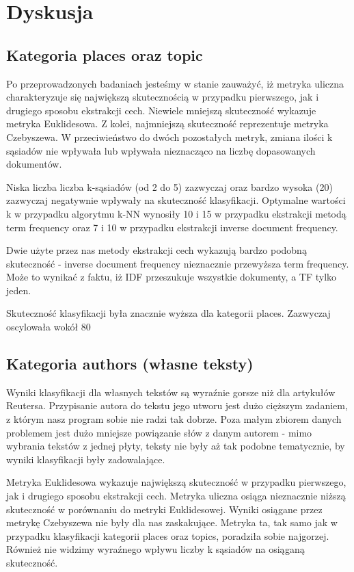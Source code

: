 \documentclass{classrep}
\begin{document}
\section{Dyskusja}

\subsection{Kategoria places oraz topic}
Po przeprowadzonych badaniach jesteśmy w stanie zauważyć, iż metryka uliczna charakteryzuje się największą skutecznością w przypadku pierwszego, jak i drugiego sposobu ekstrakcji cech. Niewiele mniejszą skuteczność wykazuje metryka Euklidesowa. Z kolei, najmniejszą skuteczność reprezentuje metryka Czebyszewa. W przeciwieństwo do dwóch pozostałych metryk, zmiana ilości k sąsiadów nie wpływała lub wpływała nieznacząco na liczbę dopasowanych dokumentów. \newline

Niska liczba liczba k-sąsiadów (od 2 do 5) zazwyczaj oraz bardzo wysoka (20) zazwyczaj negatywnie wpływały na skuteczność klasyfikacji. Optymalne wartości k w przypadku algorytmu k-NN wynosiły 10 i 15 w przypadku ekstrakcji metodą term frequency oraz 7 i 10 w przypadku ekstrakcji inverse document frequency. \newline

Dwie użyte przez nas metody ekstrakcji cech wykazują bardzo podobną skuteczność - inverse document frequency nieznacznie przewyższa term frequency. Może to wynikać z faktu, iż IDF przeszukuje wszystkie dokumenty, a TF tylko jeden.  \newline

Skuteczność klasyfikacji była znacznie wyższa dla kategorii places. Zazwyczaj oscylowała wokół 80%

\subsection{Kategoria authors (własne teksty)}
Wyniki klasyfikacji dla własnych tekstów są wyraźnie gorsze niż dla artykułów Reutersa. Przypisanie autora do tekstu jego utworu jest dużo cięższym zadaniem, z którym nasz program sobie nie radzi tak dobrze. Poza małym zbiorem danych problemem jest dużo mniejsze powiązanie słów z danym autorem - mimo wybrania tekstów z jednej płyty, teksty nie były aż tak podobne tematycznie, by wyniki klasyfikacji były zadowalające.

Metryka Euklidesowa wykazuje największą skuteczność w przypadku pierwszego, jak i drugiego sposobu ekstrakcji cech. Metryka uliczna osiąga nieznacznie niższą skuteczność w porównaniu do metryki Euklidesowej. Wyniki osiągane przez metrykę Czebyszewa nie były dla nas zaskakujące. Metryka ta, tak samo jak w przypadku klasyfikacji kategorii places oraz topics, poradziła sobie najgorzej. Również nie widzimy wyraźnego wpływu liczby k sąsiadów na osiąganą skuteczność. \newline
\end{document}
